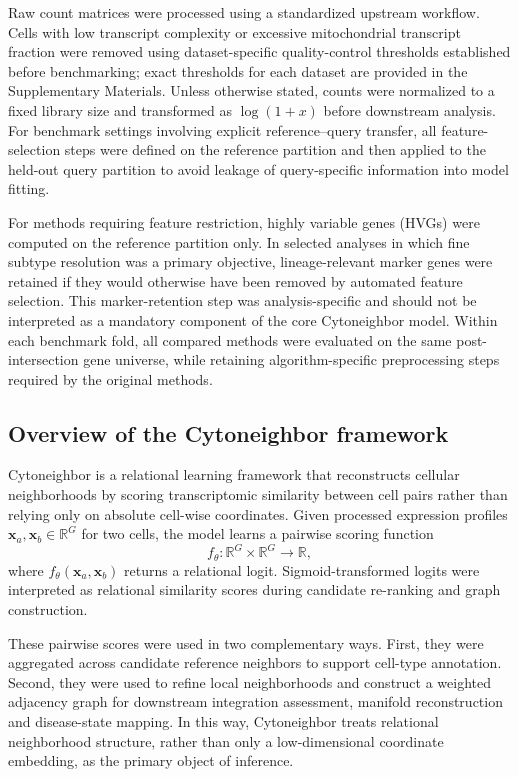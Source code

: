 \documentclass[11pt]{article}
\begin{document}
Raw count matrices were processed using a standardized upstream workflow. Cells with low transcript complexity or excessive mitochondrial transcript fraction were removed using dataset-specific quality-control thresholds established before benchmarking; exact thresholds for each dataset are provided in the Supplementary Materials. Unless otherwise stated, counts were normalized to a fixed library size and transformed as $\log(1+x)$ before downstream analysis. For benchmark settings involving explicit reference--query transfer, all feature-selection steps were defined on the reference partition and then applied to the held-out query partition to avoid leakage of query-specific information into model fitting.

For methods requiring feature restriction, highly variable genes (HVGs) were computed on the reference partition only\cite{Luecken2019BestPractices,Heumos2023BestPractices}. In selected analyses in which fine subtype resolution was a primary objective, lineage-relevant marker genes were retained if they would otherwise have been removed by automated feature selection. This marker-retention step was analysis-specific and should not be interpreted as a mandatory component of the core Cytoneighbor model. Within each benchmark fold, all compared methods were evaluated on the same post-intersection gene universe, while retaining algorithm-specific preprocessing steps required by the original methods.

\subsection{Overview of the Cytoneighbor framework}

Cytoneighbor is a relational learning framework that reconstructs cellular neighborhoods by scoring transcriptomic similarity between cell pairs rather than relying only on absolute cell-wise coordinates. Given processed expression profiles $\mathbf{x}_a, \mathbf{x}_b \in \mathbb{R}^{G}$ for two cells, the model learns a pairwise scoring function
\begin{equation}
f_{\theta} \colon \mathbb{R}^{G} \times \mathbb{R}^{G} \rightarrow \mathbb{R},
\label{eq:pairwise_scoring}
\end{equation}
where $f_{\theta}(\mathbf{x}_a,\mathbf{x}_b)$ returns a relational logit. Sigmoid-transformed logits were interpreted as relational similarity scores during candidate re-ranking and graph construction.

These pairwise scores were used in two complementary ways. First, they were aggregated across candidate reference neighbors to support cell-type annotation. Second, they were used to refine local neighborhoods and construct a weighted adjacency graph for downstream integration assessment, manifold reconstruction and disease-state mapping. In this way, Cytoneighbor treats relational neighborhood structure, rather than only a low-dimensional coordinate embedding, as the primary object of inference.
\end{document}
